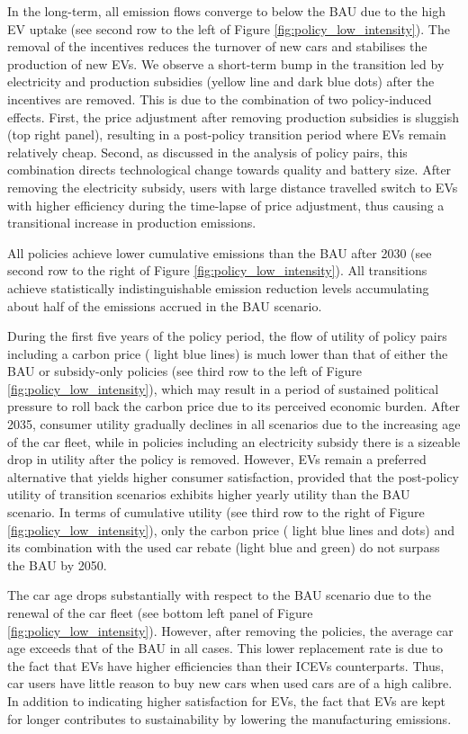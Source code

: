 \documentclass[12pt]{article}
\begin{document}
	In the long-term, all emission flows converge to below the BAU due to the high EV uptake (see second row to the left of Figure \ref{fig:policy_low_intensity}). The removal of the incentives reduces the turnover of new cars and stabilises the production of new EVs. We observe a short-term bump in the transition led by electricity and production subsidies (yellow line and dark blue dots) after the incentives are removed. This is due to the combination of two policy-induced effects. First, the price adjustment after removing production subsidies is sluggish (top right panel), resulting in a post-policy transition period where EVs remain relatively cheap. Second, as discussed in the analysis of policy pairs, this combination directs technological change towards quality and battery size. After removing the electricity subsidy, users with large distance travelled switch to EVs with higher efficiency during the time-lapse of price adjustment, thus causing a transitional increase in production emissions.

    All policies achieve lower cumulative emissions than the BAU after 2030 (see second row to the right of Figure \ref{fig:policy_low_intensity}). All transitions achieve statistically indistinguishable emission reduction levels accumulating about half of the emissions accrued in the BAU scenario.

	During the first five years of the policy period, the flow of utility of policy pairs including a carbon price ( light blue lines) is much lower than that of either the BAU or subsidy-only policies (see third row to the left of Figure \ref{fig:policy_low_intensity}), which may result in a period of sustained political pressure to roll back the carbon price due to its perceived economic burden. After 2035, consumer utility gradually declines in all scenarios due to the increasing age of the car fleet, while in policies including an electricity subsidy there is a sizeable drop in utility after the policy is removed. However, EVs remain a preferred alternative that yields higher consumer satisfaction, provided that the post-policy utility of transition scenarios exhibits higher yearly utility than the BAU scenario. In terms of cumulative utility (see third row to the right of Figure \ref{fig:policy_low_intensity}), only the carbon price ( light blue lines and dots) and its combination with the used car rebate (light blue and green) do not surpass the BAU by 2050.

	The car age drops substantially with respect to the BAU scenario due to the renewal of the car fleet (see bottom left panel of Figure \ref{fig:policy_low_intensity}). However, after removing the policies, the average car age exceeds that of the BAU in all cases. This lower replacement rate is due to the fact that EVs have higher efficiencies than their ICEVs counterparts. Thus, car users have little reason to buy new cars when used cars are of a high calibre. In addition to indicating higher satisfaction for EVs, the fact that EVs are kept for longer contributes to sustainability by lowering the manufacturing emissions.
\end{document}
